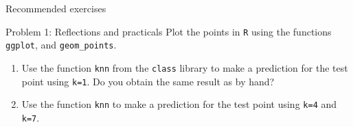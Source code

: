 \documentclass[ignorenonframetext,]{beamer}
\providecommand{\tightlist}{%
  \setlength{\itemsep}{0pt}\setlength{\parskip}{0pt}}
\begin{document}
\begin{frame}[fragile]{Recommended exercises}
\begin{block}{Problem 1: Reflections and practicals}
Plot the points in \texttt{R} using the functions \texttt{ggplot}, and
\texttt{geom\_points}.

\begin{enumerate}
\def\labelenumi{\alph{enumi}.}
\setcounter{enumi}{5}
\tightlist
\item
  Use the function \texttt{knn} from the \texttt{class} library to make
  a prediction for the test point using \texttt{k=1}. Do you obtain the
  same result as by hand?
\item
  Use the function \texttt{knn} to make a prediction for the test point
  using \texttt{k=4} and \texttt{k=7}.
\end{enumerate}

\end{block}

\end{frame}
\end{document}
